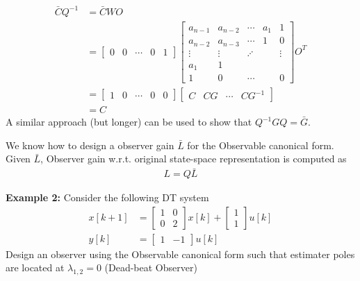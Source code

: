 \documentclass[twoside]{article}
\begin{document}
\begin{align*}
\bar{C} Q^{-1} &= \bar{C} W O 
\\
&= \left[ \begin{array}{ccccc} 0 & 0 & \cdots & 0
    & 1 \end{array} \right]
 \left[ \begin{array}{ccccc} a_{n-1} & a_{n-2} & \cdots & a_1 & 1
               \\ 
a_{n-2} & a_{n-3} & \cdots & 1 & 0
\\ \vdots & \vdots & \iddots & & \vdots
\\ a_1 & 1 &  & & 
    \\ 1 & 0 & \cdots &  & 0 \end{array} \right] O^T 
  \\
&= \left[ \begin{array}{ccccc} 1 & 0 & \cdots & 0 & 0 \end{array}
                                                    \right]
\left[ \begin{array}{cccc} C & C G & \cdots & C G^{-1} \end{array}
                                                    \right]
\\
&= C
\end{align*}
%
A similar approach (but longer) can be used to show 
that $Q^{-1} G Q = \bar{G}$. 

We know how to design a
observer gain $\bar{L}$ for the Observable
canonical form. Given $\bar{L}$, Observer gain 
w.r.t. original state-space representation is 
computed as 
%
\begin{align*}
 L = Q \bar{L}
\end{align*}

\textbf{Example 2:} Consider the following DT system
%
\begin{align*}
 x[k+1] &= \left[ \begin{array}{cc} 1 & 0 \\ 0 & 2 \end{array} \right] x[k]
    + \left[ \begin{array}{c} 1 \\ 1 \end{array} \right] u[k]
\\
 y[k] &= \left[ \begin{array}{cc} 1 & -1 \end{array} \right] u[k]
\end{align*}
% 
Design an observer using the Observable canonical form 
such that estimater poles are located at $\lambda_{1,2} = 0$ (Dead-beat Observer)
\end{document}
